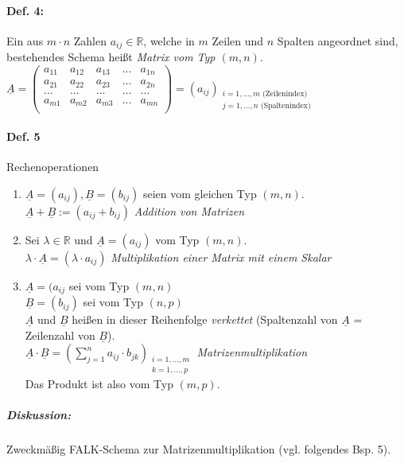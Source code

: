 \paragraph{Def. 4:} \parskp
Ein aus $m\cdot n$ Zahlen $a_{ij}\in \mathbb{R}$, welche in $m$ Zeilen und $n$ Spalten angeordnet sind, bestehendes Schema heißt \emph{Matrix vom Typ $(m,n)$}.\\
$\underline{A}=\begin{pmatrix}
a_{11} & a_{12} & a_{13}& ... &a_{1n}\\
a_{21} & a_{22} & a_{23}& ... &a_{2n}\\
... & ... & ... &... & ...\\
a_{m1} & a_{m2} & a_{m3} &...& a_{mn}\\
\end{pmatrix}=(a_{ij})_{\substack{i=1,...,m \text{ (Zeilenindex)} \\ j=1,...,n \text{ (Spaltenindex)}}}
$

\paragraph{Def. 5} Rechenoperationen
\begin{enumerate}
\item $\underline{A}=(a_{ij}), \underline{B}=(b_{ij})$ seien vom gleichen Typ $(m,n)$.\\
$\boxed{\underline{A}+\underline{B}:= (a_{ij}+b_{ij})}$ \emph{Addition von Matrizen}
\item Sei $\lambda \in \mathbb{R}$ und $\underline{A}=(a_{ij})$ vom Typ $(m,n)$.\\
$\boxed{\lambda\cdot \underline{A}=(\lambda\cdot a_{ij})}$ \emph{Multiplikation einer Matrix mit einem Skalar}
\item $\underline{A}=(a_{ij}$ sei vom Typ $(m,n)$\\
$\underline{B}=(b_{ij})$ sei vom Typ $(n,p)$\\
$\underline{A}$ und $\underline{B}$ heißen in dieser Reihenfolge \emph{verkettet} (Spaltenzahl von $\underline{A}$ = Zeilenzahl von $\underline{B}$).\\
$\boxed{\underline{A}\cdot \underline{B}= \left( \sum_{j=1}^{n} a_{ij}\cdot b_{jk}\right)_{\substack{i=1,...,m \\ k= 1,...,p}}}$ \emph{Matrizenmultiplikation}\\
Das Produkt ist also vom Typ $(m,p)$.
\end{enumerate}
\subparagraph{Diskussion:} \parskp
Zweckmäßig FALK-Schema zur Matrizenmultiplikation (vgl. folgendes Bsp. 5).

